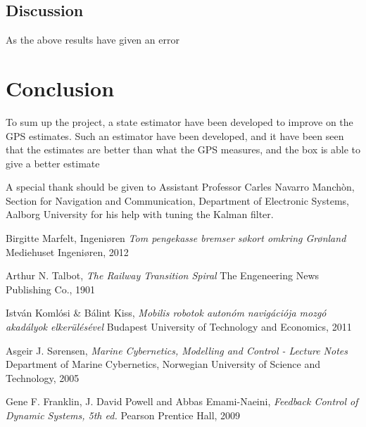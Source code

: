 \documentclass{ifacconf}
\begin{document}
\subsection{Discussion}

As the above results have given an error 


\section{Conclusion}
To sum up the project, a state estimator have been developed to improve on the GPS estimates. Such an estimator have been developed, and it have been seen that the estimates are better than what the GPS measures, and the box is able to give a better estimate 

\begin{ack}                               %
A special thank should be given to Assistant Professor Carles Navarro Manchòn, Section for Navigation and Communication, Department of Electronic Systems, Aalborg University for his help with tuning the Kalman filter.  %
\end{ack}

%

\begin{thebibliography}{xx}

Birgitte Marfelt,
\newblock Ingeni\o ren
\newblock \emph{Tom pengekasse bremser søkort omkring Gr\o nland}
\newblock Mediehuset Ingeniøren, 2012

Arthur N. Talbot,
\newblock \emph{The Railway Transition Spiral}
\newblock The Engeneering News Publishing Co., 1901

Istv\'an Koml\'{o}si \& B\'alint Kiss, %
\newblock \emph{Mobilis robotok auton\'{o}m navig\'aci\'{o}ja mozg\'{o} akad\'alyok elker\"ul\'es\'evel} %
\newblock Budapest University of Technology and Economics, 2011 %

Asgeir J. S\o rensen,
\newblock \emph{Marine Cybernetics, Modelling and Control - Lecture Notes}
\newblock Department of Marine Cybernetics, Norwegian University of Science and Technology, 2005

Gene F. Franklin, J. David Powell and Abbas Emami-Naeini,
\newblock \emph{Feedback Control of Dynamic Systems, 5th ed.}
\newblock Pearson Prentice Hall, 2009

\end{thebibliography}
\end{document}
